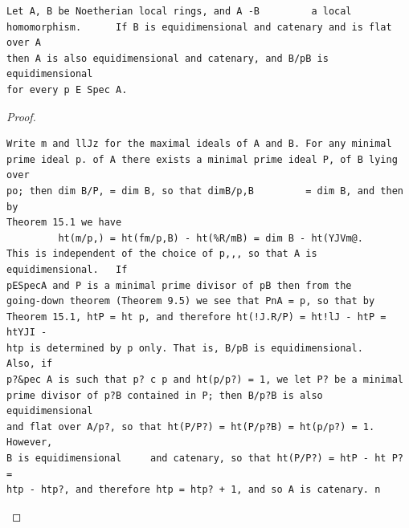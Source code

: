 \begin{theorem}\label{mcrt-auto-theorem-31-5}\uses{}
\begin{verbatim}
Let A, B be Noetherian local rings, and A -B         a local
homomorphism.      If B is equidimensional and catenary and is flat over A
then A is also equidimensional and catenary, and B/pB is equidimensional
for every p E Spec A.
\end{verbatim}
\end{theorem}
\begin{proof}
\begin{verbatim}
Write m and llJz for the maximal ideals of A and B. For any minimal
prime ideal p. of A there exists a minimal prime ideal P, of B lying over
po; then dim B/P, = dim B, so that dimB/p,B         = dim B, and then by
Theorem 15.1 we have
         ht(m/p,) = ht(fm/p,B) - ht(%R/mB) = dim B - ht(YJVm@.
This is independent of the choice of p,,, so that A is equidimensional.   If
pESpecA and P is a minimal prime divisor of pB then from the
going-down theorem (Theorem 9.5) we see that PnA = p, so that by
Theorem 15.1, htP = ht p, and therefore ht(!J.R/P) = ht!lJ - htP = htYJI -
htp is determined by p only. That is, B/pB is equidimensional.      Also, if
p?&pec A is such that p? c p and ht(p/p?) = 1, we let P? be a minimal
prime divisor of p?B contained in P; then B/p?B is also equidimensional
and flat over A/p?, so that ht(P/P?) = ht(P/p?B) = ht(p/p?) = 1. However,
B is equidimensional     and catenary, so that ht(P/P?) = htP - ht P? =
htp - htp?, and therefore htp = htp? + 1, and so A is catenary. n
\end{verbatim}
\end{proof}


